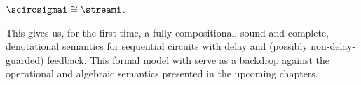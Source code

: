 \begin{corollary}
    \(\scircsigmai \cong \streami\).
\end{corollary}

This gives us, for the first time, a fully compositional, sound and complete,
denotational semantics for sequential circuits with delay and (possibly
non-delay-guarded) feedback.
This formal model with serve as a backdrop against the operational and
algebraic semantics presented in the upcoming chapters.